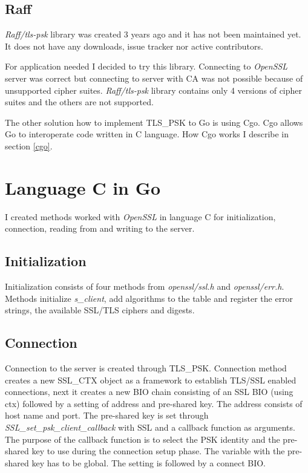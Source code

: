 \documentclass[
  digital, %
  notable,   %
  lof,     %
  lot,     %
]{fithesis3}
\begin{document}
\subsection{Raff}\label{raff}
\textit{Raff/tls-psk} library was created 3 years ago and it has not been 
maintained yet. It does not have any downloads, issue tracker nor active contributors. 

For application needed I decided to try this library. Connecting to \textit{OpenSSL} server was 
correct but connecting to server with CA was not possible because of unsupported cipher 
suites. \textit{Raff/tls-psk} library contains only 4 versions of cipher suites and the others 
are not supported. 

The other solution how to implement TLS\_PSK to Go is using Cgo. Cgo allows Go to 
interoperate code written in C language. How Cgo works I describe in section \ref{cgo}. 


\section{Language C in Go}\label{langCinGo}
I created methods worked with \textit{OpenSSL} in language C for initialization, connection, 
reading from and writing to the server.

\subsection{Initialization}
Initialization consists of four methods from \textit{openssl/ssl.h} and \textit{openssl/err.h}. 
Methods initialize \textit{s\_client}, add algorithms to the table and register the error strings, 
the available SSL/TLS ciphers and digests.

\subsection{Connection}\label{conn}
Connection to the server is created through TLS\_PSK. Connection method creates a new SSL\_CTX 
object as a framework to establish TLS/SSL enabled connections, next it creates a new BIO chain 
consisting of an SSL BIO (using ctx) followed by a setting of address and pre-shared key. The 
address consists of host name and port. The pre-shared key is set through 
\textit{SSL\_set\_psk\_client\_callback} with SSL and a callback function as arguments. The 
purpose of the callback function is to select the PSK identity and the pre-shared key to use 
during the connection setup phase. The variable with the pre-shared key has to be global. The 
setting is followed by a connect BIO.
\end{document}

